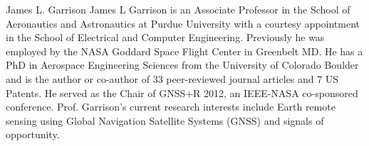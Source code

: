 \documentclass[draftcls,onecolumn]{IEEEtran}  %
\begin{document}
\begin{IEEEbiography}
{James L. Garrison}
James L Garrison is an Associate Professor in the School of Aeronautics and Astronautics at Purdue University with a courtesy appointment in the School of Electrical and Computer Engineering. Previously he was employed by the NASA Goddard Space Flight Center in Greenbelt MD. He has a PhD in Aerospace Engineering Sciences from the University of Colorado Boulder and is the author or co-author of 33 peer-reviewed journal articles and 7 US Patents. He served as the Chair of GNSS+R 2012, an IEEE-NASA co-sponsored conference. 
Prof. Garrison's current research interests include Earth remote sensing using Global Navigation Satellite Systems (GNSS) and signals of opportunity. 
\end{IEEEbiography}






\end{document}
